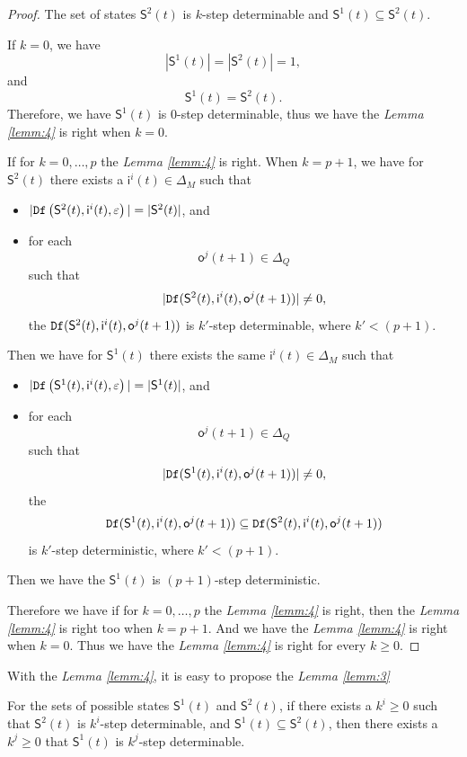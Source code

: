 \begin{proof}
The set of states $\mathsf{S}^{2}(t)$ is $k$-step determinable and $\mathsf{S}^{1}(t)\subseteq \mathsf{S}^{2}(t)$. %

If $k=0$, we have \[|\mathsf{S}^{1}(t)|=|\mathsf{S}^{2}(t)|=1,\] and \[\mathsf{S}^{1}(t) = \mathsf{S}^{2}(t).\] Therefore, we have $\mathsf{S}^{1}(t)$ is $0$-step determinable, thus we have the {\em Lemma \ref{lemm:4}} is right when $k=0$.


 
 If for $k=0,\ldots, p$ the {\em Lemma \ref{lemm:4}} is right. When $k=p+1$, we have for $\mathsf{S}^{2}(t)$ there exists a $\mathsf{i}^{i}(t)\in \Delta_M$ such that
 \begin{itemize}
 \item  $|{\tt Df}\left(\mathsf{S}^{2}(t),\mathsf{i}^{i}(t),\varepsilon\right)|=|\mathsf{S}^{2}(t)|$, and 
 \item  for each \[\mathsf{o}^{j}(t+1)\in \Delta_Q\] such that \[|{\tt Df}(\mathsf{S}^{2}(t),\mathsf{i}^{i}(t),\mathsf{o}^{j}(t+1))|\neq 0,\] the ${\tt Df}(\mathsf{S}^{2}(t),\mathsf{i}^{i}(t),\mathsf{o}^{j}(t+1))$ is $k'$-step determinable, where ${k'}<(p+1)$.
 \end{itemize}
 Then we have for $\mathsf{S}^{1}(t)$ there exists the same $\mathsf{i}^{i}(t)\in \Delta_M$ such that
 \begin{itemize}
 \item  $|{\tt Df}\left(\mathsf{S}^{1}(t),\mathsf{i}^{i}(t),\varepsilon\right)|=|\mathsf{S}^{1}(t)|$, and 
 \item  for each \[\mathsf{o}^{j}(t+1)\in \Delta_Q\] such that \[|{\tt Df}(\mathsf{S}^{1}(t),\mathsf{i}^{i}(t),\mathsf{o}^{j}(t+1))|\neq 0,\] the \[{\tt Df}(\mathsf{S}^{1}(t),\mathsf{i}^{i}(t),\mathsf{o}^{j}(t+1))\subseteq {\tt Df}(\mathsf{S}^{2}(t),\mathsf{i}^{i}(t),\mathsf{o}^{j}(t+1))\] is  $k'$-step deterministic, where ${k'}<(p+1)$.
 \end{itemize}  Then we have the $\mathsf{S}^{1}(t)$ is $(p+1)$-step deterministic. 
 
 Therefore we have if for $k=0,\ldots, p$ the {\em Lemma \ref{lemm:4}} is right, then the {\em Lemma \ref{lemm:4}} is right too when $k=p+1$. 
And we have the {\em Lemma \ref{lemm:4}} is right when $k=0$. Thus we have the {\em Lemma \ref{lemm:4}} is right for every $k\ge0$.
 
\end{proof}
With the {\em Lemma \ref{lemm:4}}, it is easy to propose the {\em Lemma \ref{lemm:3}}
\begin{lemma}
For the sets of possible states $\mathsf{S}^{1}(t)$ and $\mathsf{S}^{2}(t)$, if there exists a $k^{i}\ge 0$ such that $\mathsf{S}^{2}(t)$ is $k^{i}$-step determinable, and $\mathsf{S}^{1}(t)\subseteq \mathsf{S}^{2}(t)$, then there exists a $k^{j}\ge 0$ that $\mathsf{S}^{1}(t)$ is $k^{j}$-step determinable.
\label{lemm:3}
\end{lemma}

